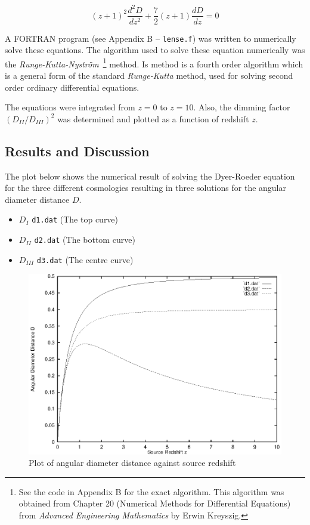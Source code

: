 \documentclass[a4paper]{IEEEtran}
\begin{document}
\begin{equation}
    (z+1)^2 \frac{d^2D}{dz^2} + \frac{7}{2}(z+1)\frac{dD}{dz} = 0
\end{equation}

A FORTRAN program (see Appendix B -- \texttt{lense.f}) was written
to numerically solve these equations. The algorithm used to solve these
equation numerically was the \emph{Runge-Kutta-Nystr\"{o}m}~\footnote{
See the code in Appendix B for the exact algorithm. This algorithm
was obtained from Chapter 20 (Numerical Methods for Differential Equations)
from \emph{Advanced Engineering Mathematics} by Erwin Kreyszig.}
method.  Is method is a fourth order algorithm which is a general form 
of the standard \emph{Runge-Kutta} method, used for solving second order 
ordinary differential equations.

The equations were integrated from $z = 0$ to $z = 10$. 
Also, the dimming factor $(D_{II}/D_{III})^2$ was determined and plotted
as a function of redshift $z$.

\subsection{Results and Discussion} 
The plot below shows the numerical result of solving the Dyer-Roeder
equation for the three different cosmologies resulting in three
solutions for the angular diameter distance $D$.
\begin{itemize}
    \item $D_{I}$   \texttt{d1.dat} (The top curve)
    \item $D_{II}$  \texttt{d2.dat} (The bottom curve)
    \item $D_{III}$ \texttt{d3.dat} (The centre curve)
\end{itemize}

\begin{figure}
    \caption{Plot of angular diameter distance against source redshift} 
    \label{fig:diam-vs-redshift} 
    \begin{center}
        \includegraphics[width=\columnwidth]{results/cosmo_all.eps}
    \end{center}
\end{figure}
\end{document}
